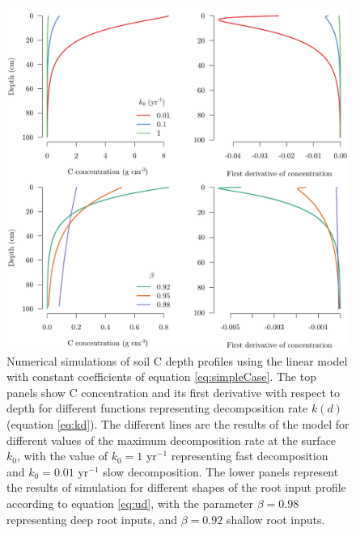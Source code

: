 \documentclass[11pt, oneside, a4paper]{article}   	%
\begin{document}
\begin{figure}[htbp]
   \centering
   \includegraphics[width=\textwidth]{Figures/rootDecomp.pdf} %
%
   \caption{Numerical simulations of soil C depth profiles using the linear model with constant coefficients of equation \ref{eq:simpleCase}. The top panels show C concentration and its first derivative with respect to depth for different functions representing decomposition rate $k(d)$ (equation \ref{eq:kd}). The different lines are the results of the model for different values of the maximum decomposition rate at the surface $k_0$, with the value of $k_0 =1$ yr$^{-1}$ representing fast decomposition and $k_0 = 0.01$ yr$^{-1}$ slow decomposition. The lower panels represent the results of simulation for different shapes of the root input profile according to equation \ref{eq:ud}, with the parameter $\beta = 0.98$ representing deep root inputs, and $\beta = 0.92$ shallow root inputs.}
   \label{fig:rootDecomp}
\end{figure}
\end{document}
